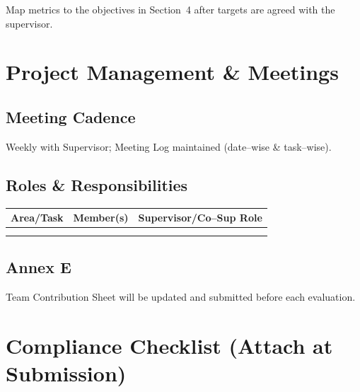 \documentclass[11pt,a4paper]{article}
\begin{document}
\vspace{0.3em}
Map metrics to the objectives in Section~4 after targets are agreed with the supervisor.

\section{Project Management \& Meetings}

\subsection{Meeting Cadence}

Weekly with Supervisor; Meeting Log maintained (date--wise \& task--wise).

\subsection{Roles \& Responsibilities}

\begin{tabularx}{\textwidth}{@{}*{3}{X}@{}}
\toprule
\textbf{Area/Task} & \textbf{Member(s)} & \textbf{Supervisor/Co--Sup Role} \\
\midrule
 &  &  \\
 &  &  \\
\bottomrule
\end{tabularx}

\subsection{Annex E}

Team Contribution Sheet will be updated and submitted before each evaluation.

\section{Compliance Checklist (Attach at Submission)}
\end{document}
